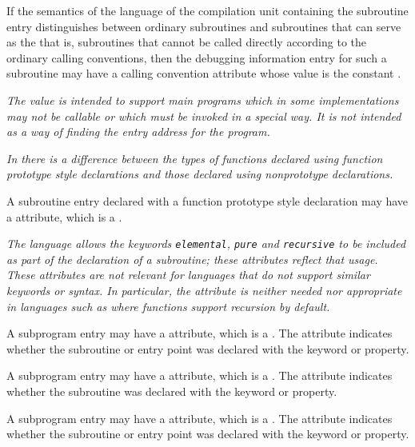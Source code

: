 If the semantics of the language of the compilation unit
containing the subroutine entry distinguishes between ordinary
subroutines and subroutines that can serve as the  that is, subroutines that cannot be called
directly according to the ordinary calling conventions,
then the debugging information entry for such a subroutine
may have a calling convention attribute whose value is the
constant \DWCCprogramTARG.

\textit{The \DWCCprogram{} 
value is intended to support  main
programs which in some implementations may not be callable
or which must be invoked in a special way. It is not intended
as a way of finding the entry address for the program.
}

\textit{In 
there is a difference between the types of functions
declared using function prototype style declarations and
those declared using non\dash prototype declarations.
}

A subroutine entry declared with a function prototype style
declaration may have 
a 
\DWATprototyped{} attribute, which is
a .

\textit{The  
language allows the keywords \texttt{elemental}, \texttt{pure}
and \texttt{recursive} to be included as part of the declaration of
a subroutine; these attributes reflect that usage. These
attributes are not relevant for languages that do not support
similar keywords or syntax. In particular, the \DWATrecursive{}
attribute is neither needed nor appropriate in languages such
as  
where functions support recursion by default.
}

A subprogram entry 
\hypertarget{chap:DWATelementalelementalpropertyofasubroutine}{}
may have 
a 
\DWATelemental{} attribute, which
is a . 
The attribute indicates whether the subroutine
or entry point was declared with the  keyword
or property.

A 
\hypertarget{chap:DWATpurepurepropertyofasubroutine}{}
subprogram entry may have 
a 
\DWATpure{} attribute, which is
a . 
The attribute indicates whether the subroutine was
declared with the  keyword or property.

A 
\hypertarget{chap:DWATrecursiverecursivepropertyofasubroutine}{}
subprogram entry may have a 
\DWATrecursive{} attribute, which
is a . 
The attribute indicates whether the subroutine
or entry point was declared with the  keyword
or property.



